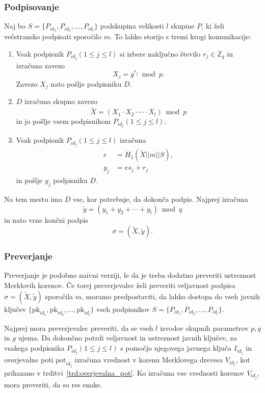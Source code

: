 \documentclass[isrm2, tisk]{fmfdelo}
\newcommand{\Z}{\mathbb Z}
\begin{document}
\subsubsection{Podpisovanje}
Naj bo $S = \{P_{id_1}, P_{id_2}, \dots, P_{id_l}\}$ podskupina velikosti $l$ skupine $P$, ki želi
večstransko podpisati sporočilo $m$. To lahko storijo s tremi krogi komunikacije:
\begin{enumerate}
    \item Vsak podpisnik $P_{id_j} (1 \le j \le l)$ si izbere naključno število $r_j \in \Z_q$
        in izračuna zavezo
        $$ 
        X_j = g^{r_j} \bmod p.
        $$
        Zavezo $X_j$ nato pošlje podpisniku $D$.
    \item $D$ izračuna skupno zavezo
        $$ 
        \tilde{X} = (X_1 \cdot X_2 \cdot \cdots \cdot X_l) \bmod p
        $$
        in jo pošlje vsem podpisnikom $P_{id_j} (1 \le j \le l)$.
    \item Vsak podpisnik $P_{id_j} (1 \le j \le l)$ izračuna
        \begin{align*}
            e &= H_5(\tilde{X} || m || S), \\
            y_j &= e s_j + r_j
        \end{align*}
        in pošlje $y_j$ podpisniku $D$.
\end{enumerate}
Na tem mestu ima $D$ vse, kar potrebuje, da dokonča podpis. Najprej izračuna
$$
\tilde{y} = (y_1 + y_2 + \cdots + y_l) \bmod q
$$
in nato vrne končni podpis
$$
\sigma = (\tilde{X}, \tilde{y}).
$$

\subsubsection{Preverjanje}
Preverjanje je podobno naivni verziji, le da je treba dodatno preveriti ustreznost Merklovih
korenov. Če torej preverjevalec želi preveriti veljavnost podpisa $\sigma = (\tilde{X}, \tilde{y})$
sporočila $m$, moramo predpostaviti, da lahko dostopa do vseh javnih ključev $\{\text{pk}_{id_1},
\text{pk}_{id_2}, \dots, \text{pk}_{id_l}\}$ vseh podpisnikov $S = \{P_{id_1}, P_{id_2}, \dots, 
P_{id_l}\}$.

Najprej mora preverjevalec preveriti, da se vseh $l$ izvodov skupnih parametrov $p, q$ in $g$ ujema.
Da dokončno potrdi veljavnost in ustreznost javnih ključev, za vsakega podpisnika $P_{id_j} (1 \le
j \le l)$ s pomočjo njegovega javnega ključa $I_{id_j}$ in overjevalne poti $\text{pot}_{id_j}$
izračuna vrednost v korenu Merklovega drevesa $V_{id_j}$, kot prikazano v trditvi~\ref{trd:overjevalna_pot}.
Ko izračuna vse vrednosti korenov $V_{id_j}$, mora preveriti, da so res enake. 
\end{document}
